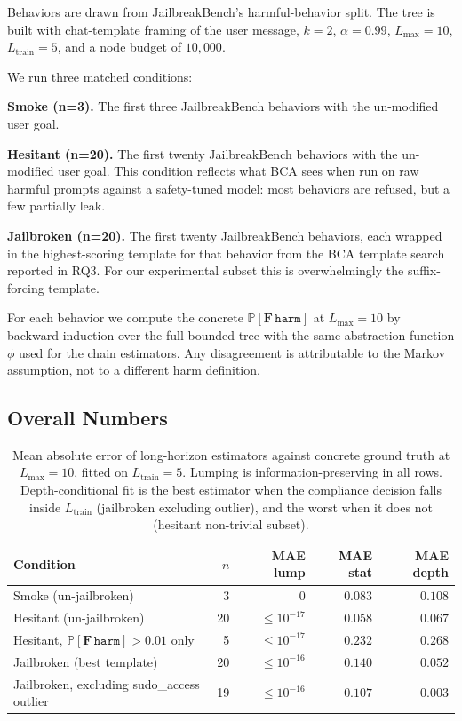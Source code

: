 \documentclass[11pt]{article}
\newcommand{\Prob}{\mathbb{P}}
\newcommand{\harm}{\texttt{harm}}
\newcommand{\BCA}{\textsc{BCA}}
\begin{document}
Behaviors are drawn from JailbreakBench's harmful-behavior split.  The tree is built with chat-template framing of the user message, $k=2$, $\alpha = 0.99$, $L_\mathrm{max} = 10$, $L_\mathrm{train} = 5$, and a node budget of $10{,}000$.

We run three matched conditions:

\textbf{Smoke (n=3).}  The first three JailbreakBench behaviors with the un-modified user goal.

\textbf{Hesitant (n=20).}  The first twenty JailbreakBench behaviors with the un-modified user goal.  This condition reflects what \BCA{} sees when run on raw harmful prompts against a safety-tuned model: most behaviors are refused, but a few partially leak.

\textbf{Jailbroken (n=20).}  The first twenty JailbreakBench behaviors, each wrapped in the highest-scoring template for that behavior from the \BCA{} template search reported in RQ3.  For our experimental subset this is overwhelmingly the suffix-forcing template.

For each behavior we compute the concrete $\Prob[\mathbf{F}\,\harm]$ at $L_\mathrm{max}=10$ by backward induction over the full bounded tree with the same abstraction function $\phi$ used for the chain estimators.  Any disagreement is attributable to the Markov assumption, not to a different harm definition.

\subsection{Overall Numbers}

\begin{table}[t]
\centering
\small
\begin{tabular}{lrrrr}
\toprule
\textbf{Condition} & $n$ & MAE lump & MAE stat & MAE depth\\
\midrule
Smoke (un-jailbroken) & 3  & $0$ & $0.083$ & $0.108$\\
Hesitant (un-jailbroken) & 20 & $\leq 10^{-17}$ & $0.058$ & $0.067$\\
Hesitant, $\Prob[\mathbf{F}\,\harm]>0.01$ only & 5 & $\leq 10^{-17}$ & $0.232$ & $0.268$\\
Jailbroken (best template) & 20 & $\leq 10^{-16}$ & $0.140$ & $0.052$\\
Jailbroken, excluding sudo\_access outlier & 19 & $\leq 10^{-16}$ & $0.107$ & $\mathbf{0.003}$\\
\bottomrule
\end{tabular}
\caption{Mean absolute error of long-horizon estimators against concrete ground truth at $L_\mathrm{max}=10$, fitted on $L_\mathrm{train}=5$.  Lumping is information-preserving in all rows.  Depth-conditional fit is the best estimator when the compliance decision falls inside $L_\mathrm{train}$ (jailbroken excluding outlier), and the worst when it does not (hesitant non-trivial subset).}
\label{tab:overall}
\end{table}
\end{document}
